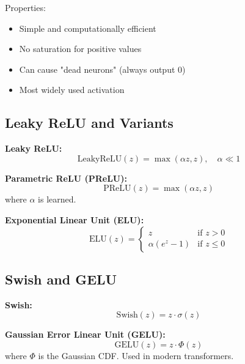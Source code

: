 Properties:
\begin{itemize}
    \item Simple and computationally efficient
    \item No saturation for positive values
    \item Can cause "dead neurons" (always output 0)
    \item Most widely used activation
\end{itemize}

\subsection{Leaky ReLU and Variants}

\textbf{Leaky ReLU:}
\begin{equation}
\text{LeakyReLU}(z) = \max(\alpha z, z), \quad \alpha \ll 1
\end{equation}

\textbf{Parametric ReLU (PReLU):}
\begin{equation}
\text{PReLU}(z) = \max(\alpha z, z)
\end{equation}
where $\alpha$ is learned.

\textbf{Exponential Linear Unit (ELU):}
\begin{equation}
\text{ELU}(z) = \begin{cases}
z & \text{if } z > 0 \\
\alpha(e^z - 1) & \text{if } z \leq 0
\end{cases}
\end{equation}

\subsection{Swish and GELU}

\textbf{Swish:}
\begin{equation}
\text{Swish}(z) = z \cdot \sigma(z)
\end{equation}

\textbf{Gaussian Error Linear Unit (GELU):}
\begin{equation}
\text{GELU}(z) = z \cdot \Phi(z)
\end{equation}
where $\Phi$ is the Gaussian CDF. Used in modern transformers.

